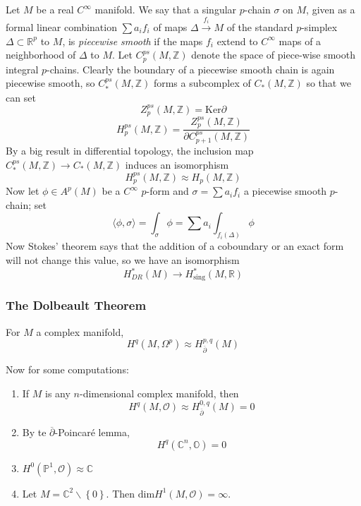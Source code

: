 \indent Let $M$ be a real $ C^{\infty}$ manifold. We say that a singular $p$-chain $\sigma$ on $M$, given as a formal linear combination $\sum a_i f_i$ of maps $\Delta \xrightarrow{f_i} M$ of the standard $p$-simplex $\Delta \subset \mathbb{R}^p$ to $M$, is \textit{piecewise smooth} if the maps $f_i$ extend to $ C^{\infty}$ maps of a neighborhood of $\Delta$ to $M$. Let $C^{ps}_p \left( M, \mathbb{Z} \right) $ denote the space of piece-wise smooth integral $p$-chains. Clearly the boundary of a piecewise smooth chain is again piecewise smooth, so $C^{ps}_* \left( M, \mathbb{Z} \right) $ forms a subcomplex of $C_* \left( M, \mathbb{Z} \right) $ so that we can set
\[
	Z^{ps}_p \left( M, \mathbb{Z} \right) = \mathrm{Ker}\partial
\]
\[
	H^{ps}_p \left( M, \mathbb{Z} \right) = \frac{Z^{ps}_p \left( M, \mathbb{Z} \right) }{\partial C^{ps}_{p+1} \left( M, \mathbb{Z} \right) }
\]
By a big result in differential topology, the inclusion map $ C^{ps}_* \left( M, \mathbb{Z} \right) \to C_* \left( M, \mathbb{Z} \right) $ induces an isomorphism
\[
	H^{ps}_p \left( M, \mathbb{Z} \right) \approx H_p \left( M, \mathbb{Z} \right) 
\]
\indent Now let $ \phi \in A^p (M)$ be a $ C^{\infty} $ $p$-form and $\sigma = \sum a_i f_i$ a piecewise smooth $p$-chain; set
\[
	\langle \phi, \sigma \rangle = \int_{\sigma} \phi = \sum a_i \int_{f_i (\Delta)} \phi
\]
Now Stokes' theorem says that the addition of a coboundary or an exact form will not change this value, so we have an isomorphism
\[
	H^*_{DR} (M) \to H^*_{ \mathrm{sing} } (M, \mathbb{R})
\]

\subsubsection{The Dolbeault Theorem}


\begin{thm}

For $M$ a complex manifold,
\[
	H^q (M, \Omega^p) \approx H^{p,q}_{ \overline{\partial} } (M)
\]


\end{thm}
Now for some computations:

\begin{enumerate}
\item If $M$ is any $n$-dimensional complex manifold, then
	\[
		H^q (M, \mathcal{O}) \approx H^{0,q}_{ \overline{\partial} }(M) = 0
	\]
\item By te $ \overline{\partial}$-Poincar\'e lemma,
	\[
		H^q ( \mathbb{C}^n, \mathbb{O} ) = 0
	\]
\item $H^0 ( \mathbb{P}^1, \mathcal{O}) \approx \mathbb{C}$
\item Let $M = \mathbb{C}^2 \backslash \left\{ 0 \right\} $. Then $ \mathrm{dim}H^1 ( M, \mathcal{O}) = \infty$.
\end{enumerate}

